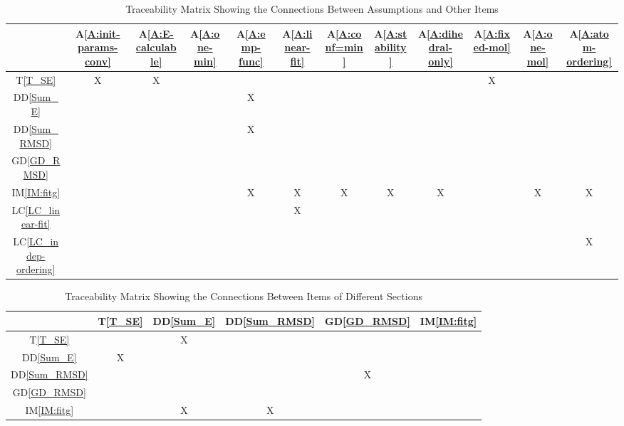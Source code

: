 \documentclass[12pt]{article}
\newcommand{\dref}[1]{GD\ref{#1}}
\newcommand{\ddref}[1]{DD\ref{#1}}
\newcommand{\tref}[1]{T\ref{#1}}
\newcommand{\aref}[1]{A\ref{#1}}
\newcommand{\iref}[1]{IM\ref{#1}}
\newcommand{\lcref}[1]{LC\ref{#1}}
\begin{document}
\begin{table}[h!]
\centering
\label{Table:A_trace}
\begin{tabular}{|c|c|c|c|c|c|c|c|c|c|c|c|}
\hline
	& \aref{A:init-params-conv} 
	& \aref{A:E-calculable}
	& \aref{A:one-min}
	& \aref{A:emp-func}
	& \aref{A:linear-fit}
	& \aref{A:conf=min}
	& \aref{A:stability}
	& \aref{A:dihedral-only}
	& \aref{A:fixed-mol}
	& \aref{A:one-mol}
	& \aref{A:atom-ordering} \\
\hline
\tref{T_SE}               &X&X& & & & & & &X& & \\ \hline
\ddref{Sum_E}             & & & &X& & & & & & & \\ \hline
\ddref{Sum_RMSD}          & & & &X& & & & & & & \\ \hline
\dref{GD_RMSD}            & & & & & & & & & & & \\ \hline
\iref{IM:fitg}            & & & &X&X&X&X&X& &X&X\\ \hline
\lcref{LC_linear-fit}     & & & & &X& & & & & & \\ \hline
\lcref{LC_indep-ordering} & & & & & & & & & & &X\\ \hline
\end{tabular}
\caption{Traceability Matrix Showing the Connections Between Assumptions and Other Items}

\end{table}



\begin{table}[H]
	\centering
	\label{Table:trace}
	\begin{tabular}{|c|c|c|c|c|c|}
		\hline        
		& \tref{T_SE} 
		& \ddref{Sum_E}
		& \ddref{Sum_RMSD}
		& \dref{GD_RMSD}
		& \iref{IM:fitg} \\
		\hline
		\tref{T_SE} & & X & & & \\ \hline
		\ddref{Sum_E} & X & & & &  \\ \hline
		\ddref{Sum_RMSD} & & & & X & \\ \hline
		\dref{GD_RMSD} & & & & & \\ \hline
		\iref{IM:fitg} & & X & X & & \\
		\hline
	\end{tabular}
	\caption{Traceability Matrix Showing the Connections Between Items of 
	Different Sections}
\end{table}
\end{document}
